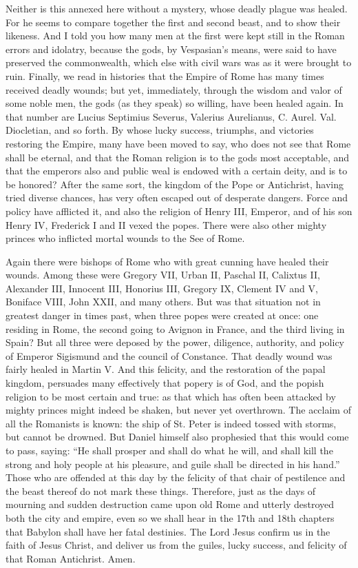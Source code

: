 Neither is this annexed here without a mystery, whose deadly plague was healed. For he seems to compare together the first and second beast, and to show their likeness. And I told you how many men at the first were kept still in the Roman errors and idolatry, because the gods, by Vespasian’s means, were said to have preserved the commonwealth, which else with civil wars was as it were brought to ruin. Finally, we read in histories that the Empire of Rome has many times received deadly wounds; but yet, immediately, through the wisdom and valor of some noble men, the gods (as they speak) so willing, have been healed again. In that number are Lucius Septimius Severus, Valerius Aurelianus, C. Aurel. Val. Diocletian, and so forth. By whose lucky success, triumphs, and victories restoring the Empire, many have been moved to say, who does not see that Rome shall be eternal, and that the Roman religion is to the gods most acceptable, and that the emperors also and public weal is endowed with a certain deity, and is to be honored? After the same sort, the kingdom of the Pope or Antichrist, having tried diverse chances, has very often escaped out of desperate dangers. Force and policy have afflicted it, and also the religion of Henry III, Emperor, and of his son Henry IV, Frederick I and II vexed the popes. There were also other mighty princes who inflicted mortal wounds to the See of Rome.

Again there were bishops of Rome who with great cunning have healed their wounds. Among these were Gregory VII, Urban II, Paschal II, Calixtus II, Alexander III, Innocent III, Honorius III, Gregory IX, Clement IV and V, Boniface VIII, John XXII, and many others. But was that situation not in greatest danger in times past, when three popes were created at once: one residing in Rome, the second going to Avignon in France, and the third living in Spain? But all three were deposed by the power, diligence, authority, and policy of Emperor Sigismund and the council of Constance. That deadly wound was fairly healed in Martin V. And this felicity, and the restoration of the papal kingdom, persuades many effectively that popery is of God, and the popish religion to be most certain and true: as that which has often been attacked by mighty princes might indeed be shaken, but never yet overthrown. The acclaim of all the Romanists is known: the ship of St. Peter is indeed tossed with storms, but cannot be drowned. But Daniel himself also prophesied that this would come to pass, saying: “He shall prosper and shall do what he will, and shall kill the strong and holy people at his pleasure, and guile shall be directed in his hand.” Those who are offended at this day by the felicity of that chair of pestilence and the beast thereof do not mark these things. Therefore, just as the days of mourning and sudden destruction came upon old Rome and utterly destroyed both the city and empire, even so we shall hear in the 17th and 18th chapters that Babylon shall have her fatal destinies. The Lord Jesus confirm us in the faith of Jesus Christ, and deliver us from the guiles, lucky success, and felicity of that Roman Antichrist. Amen.
